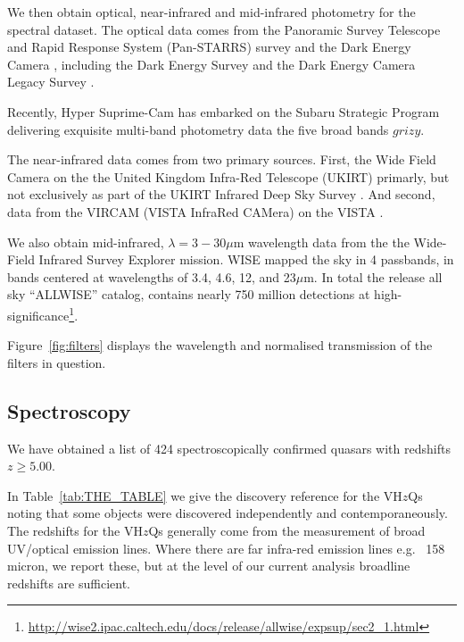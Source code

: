 \documentclass[usenatbib]{mnras}
\begin{document}
We then obtain optical, near-infrared and mid-infrared photometry for the
spectral dataset. The optical data comes from the 
Panoramic Survey Telescope and Rapid Response System (Pan-STARRS) 
survey \citep{Chambers2016} and the Dark Energy Camera \citep{Flaugher2015}, 
including the Dark Energy Survey \citep[DES;][]{Flaugher2005} and 
the Dark Energy Camera Legacy Survey \citep[DECaLS]{Dey2018}. 

Recently, Hyper Suprime-Cam \citep[HSC; ][]{Miyazaki2018} has embarked
on the Subaru Strategic Program \citep[SSP; ][]{Aihara2018a}
delivering exquisite multi-band photometry data
\citep[][]{Aihara2018b} the five broad bands $grizy$.

The near-infrared data comes from two primary sources. First, the Wide
Field Camera \citep[WFCAM; ][]{Casali2007} on the the United Kingdom
Infra-Red Telescope (UKIRT) primarly, but not exclusively as part of
the UKIRT Infrared Deep Sky Survey \citep[UKIDSS; ][]{Lawrence2007}.
And second, data from the VIRCAM (VISTA InfraRed CAMera) on the VISTA
\citep[Visible and Infrared Survey Telescope for
Astronomy;][]{Emerson2006, Dalton2006}.

We also obtain mid-infrared, $\lambda=3-30\mu$m wavelength data from the
the Wide-Field Infrared Survey Explorer \citep[WISE;][]{Wright2010, Cutri2013} mission.
WISE mapped the sky in 4 passbands, in bands centered at wavelengths of 3.4, 4.6, 12, and 23$\mu$m. 
In total the release all sky ``ALLWISE'' catalog, contains nearly 750 million detections at high-significance\footnote{
\href{http://wise2.ipac.caltech.edu/docs/release/allwise/expsup/sec2\_1.html}{http://wise2.ipac.caltech.edu/docs/release/allwise/expsup/sec2\_1.html}}. 


Figure~\ref{fig:filters} displays the wavelength and normalised transmission 
of the filters in question. 





\subsection{Spectroscopy} 
We have obtained a list of 424 spectroscopically confirmed 
quasars with redshifts $z\geq5.00$. 

In Table~\ref{tab:THE_TABLE}  we give the discovery reference for the
VH$z$Qs noting that some objects were discovered independently and
contemporaneously.  The redshifts for the VH$z$Qs generally come from
the measurement of broad UV/optical emission lines. Where 
there are far infra-red emission lines e.g. \cii~158 micron, we report 
these, but at the level of our current analysis broadline redshifts are
sufficient. 
\end{document}
